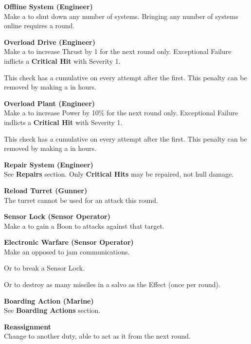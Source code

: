 \documentclass{cheatsheet}
\begin{document}
\begin{multicols}{3}
\textbf{Offline System (Engineer)}\\
Make a  to shut down any number
of systems.  Bringing any number of systems online requires a round.

\textbf{Overload Drive (Engineer)}\\
Make a  to increase
Thrust by 1 for the next round only.  Exceptional Failure inflicts a
\textbf{Critical Hit} with Severity 1.

This check has a cumulative  on every attempt after the
first.  This penalty can be removed by making a  in  hours.

\textbf{Overload Plant (Engineer)}\\
Make a  to increase
Power by 10\% for the next round only.  Exceptional Failure indlicts a
\textbf{Critical Hit} with Severity 1.

This check has a cumulative  on every attempt after the
first.  This penalty can be removed by making a  in  hours.

\textbf{Repair System (Engineer)}\\
See \textbf{Repairs} section.  Only \textbf{Critical Hits} may be
repaired, not hull damage.

\textbf{Reload Turret (Gunner)}\\
The turret cannot be used for an attack this round.

\textbf{Sensor Lock (Sensor Operator)}\\
Make a  to gain a Boon to attacks
against that target.

\textbf{Electronic Warfare (Sensor Operator)}\\
Make an opposed  to jam
communications.

Or  to break a Sensor Lock.

Or  to destroy as many
missiles in a salvo as the Effect (once per round).

\textbf{Boarding Action (Marine)}\\
See \textbf{Boarding Actions} section.

\textbf{Reassignment}\\
Change to another duty, able to act as it from the next round.


\end{multicols}
\end{document}
